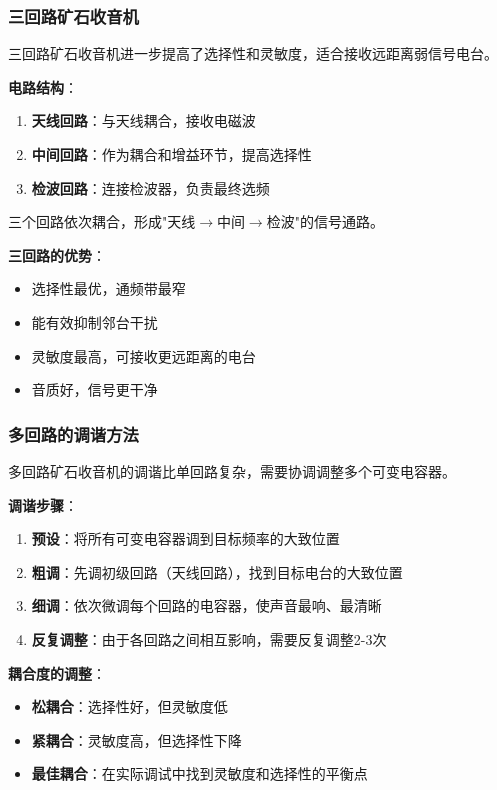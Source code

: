 \subsubsection{三回路矿石收音机}
\label{sec:triple_loop_crystal_radio}

三回路矿石收音机进一步提高了选择性和灵敏度，适合接收远距离弱信号电台。

\textbf{电路结构}：
\begin{enumerate}
    \item \textbf{天线回路}：与天线耦合，接收电磁波
    \item \textbf{中间回路}：作为耦合和增益环节，提高选择性
    \item \textbf{检波回路}：连接检波器，负责最终选频
\end{enumerate}

三个回路依次耦合，形成"天线$\to$中间$\to$检波"的信号通路。

\textbf{三回路的优势}：
\begin{itemize}
    \item 选择性最优，通频带最窄
    \item 能有效抑制邻台干扰
    \item 灵敏度最高，可接收更远距离的电台
    \item 音质好，信号更干净
\end{itemize}

\subsubsection{多回路的调谐方法}
\label{sec:multi_loop_tuning}

多回路矿石收音机的调谐比单回路复杂，需要协调调整多个可变电容器。

\textbf{调谐步骤}：
\begin{enumerate}
    \item \textbf{预设}：将所有可变电容器调到目标频率的大致位置
    \item \textbf{粗调}：先调初级回路（天线回路），找到目标电台的大致位置
    \item \textbf{细调}：依次微调每个回路的电容器，使声音最响、最清晰
    \item \textbf{反复调整}：由于各回路之间相互影响，需要反复调整2-3次
\end{enumerate}

\textbf{耦合度的调整}：
\begin{itemize}
    \item \textbf{松耦合}：选择性好，但灵敏度低
    \item \textbf{紧耦合}：灵敏度高，但选择性下降
    \item \textbf{最佳耦合}：在实际调试中找到灵敏度和选择性的平衡点
\end{itemize}

